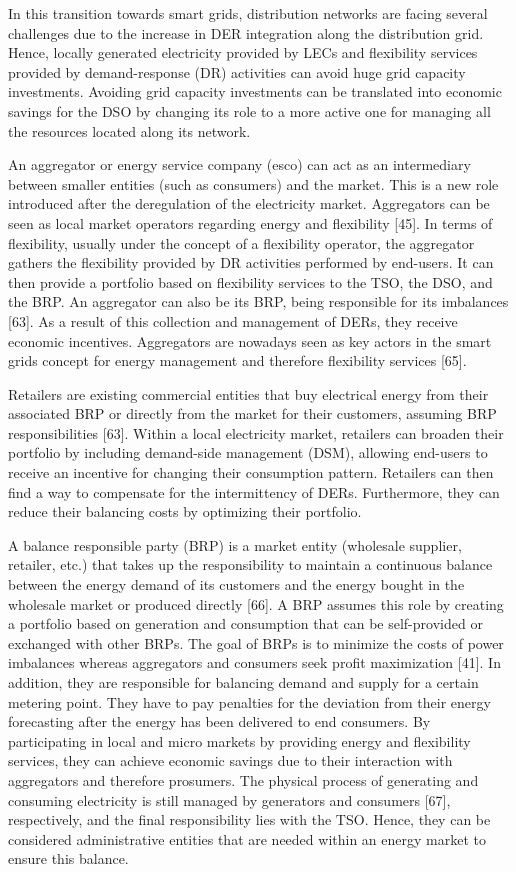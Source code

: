 In this transition towards smart grids, distribution networks are facing several challenges due to the increase in DER integration along the distribution grid. Hence, locally generated electricity provided by LECs and flexibility services provided by demand-response (DR) activities can avoid huge grid capacity investments. Avoiding grid capacity investments can be translated into economic savings for the DSO by changing its role to a more active one for managing all the resources located along its network.

An aggregator or energy service company (esco) can act as an intermediary between smaller entities (such as consumers) and the market. This is a new role introduced after the deregulation of the electricity market. Aggregators can be seen as local market operators regarding energy and flexibility [45]. In terms of flexibility, usually under the concept of a flexibility operator, the aggregator gathers the flexibility provided by DR activities performed by end-users. It can then provide a portfolio based on flexibility services to the TSO, the DSO, and the BRP. An aggregator can also be its BRP, being responsible for its imbalances [63]. As a result of this collection and management of DERs, they receive economic incentives. Aggregators are nowadays seen as key actors in the smart grids concept for energy management and therefore flexibility services [65].

Retailers are existing commercial entities that buy electrical energy from their associated BRP or directly from the market for their customers, assuming BRP responsibilities [63]. Within a local electricity market, retailers can broaden their portfolio by including demand-side management (DSM), allowing end-users to receive an incentive for changing their consumption pattern. Retailers can then find a way to compensate for the intermittency of DERs. Furthermore, they can reduce their balancing costs by optimizing their portfolio.

A balance responsible party (BRP) is a market entity (wholesale supplier, retailer, etc.) that takes up the responsibility to maintain a continuous balance between the energy demand of its customers and the energy bought in the wholesale market or produced directly [66]. A BRP assumes this role by creating a portfolio based on generation and consumption that can be self-provided or exchanged with other BRPs. The goal of BRPs is to minimize the costs of power imbalances whereas aggregators and consumers seek profit maximization [41]. In addition, they are responsible for balancing demand and supply for a certain metering point. They have to pay penalties for the deviation from their energy forecasting after the energy has been delivered to end consumers. By participating in local and micro markets by providing energy and flexibility services, they can achieve economic savings due to their interaction with aggregators and therefore prosumers. The physical process of generating and consuming electricity is still managed by generators and consumers [67], respectively, and the final responsibility lies with the TSO. Hence, they can be considered administrative entities that are needed within an energy market to ensure this balance.

